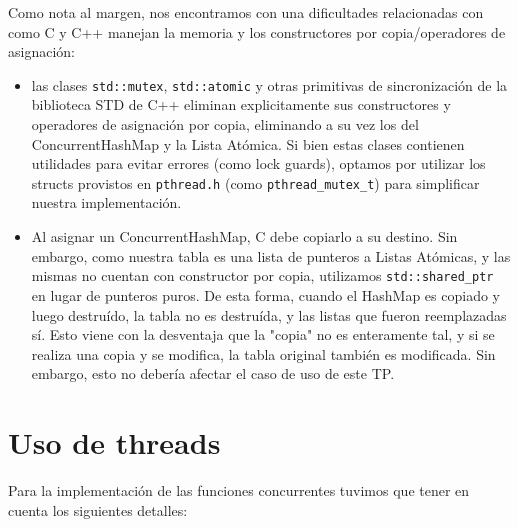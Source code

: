 Como nota al margen, nos encontramos con una dificultades relacionadas con como C y C++ manejan la memoria y los constructores por copia/operadores de asignación:

\begin{itemize}

	\item las clases \texttt{std::mutex}, \texttt{std::atomic} y otras primitivas de sincronización de la biblioteca STD de C++ eliminan explicitamente sus constructores y operadores de asignación por copia, eliminando a su vez los del ConcurrentHashMap y la Lista Atómica. Si bien estas clases contienen utilidades para evitar errores (como lock guards), optamos por utilizar los structs provistos en \texttt{pthread.h} (como \texttt{pthread\_mutex\_t}) para simplificar nuestra implementación.

	\item Al asignar un ConcurrentHashMap, C debe copiarlo a su destino. Sin embargo, como nuestra tabla es una lista de punteros a Listas Atómicas, y las mismas no cuentan con constructor por copia, utilizamos \texttt{std::shared\_ptr} en lugar de punteros puros. De esta forma, cuando el HashMap es copiado y luego destruído, la tabla no es destruída, y las listas que fueron reemplazadas sí. Esto viene con la desventaja que la "copia" no es enteramente tal, y si se realiza una copia y se modifica, la tabla original también es modificada. Sin embargo, esto no debería afectar el caso de uso de este TP.

\end{itemize}

\section{Uso de threads}

Para la implementación de las funciones concurrentes tuvimos que tener en cuenta los siguientes detalles:

